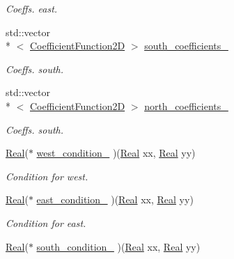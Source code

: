 \begin{DoxyCompactItemize}
\begin{DoxyCompactList}\small\item\em Coeffs. east. \end{DoxyCompactList}\item 
std\+::vector\\*
$<$ \hyperlink{group__c07-mim__ops_gad9e1c0ace886b0029aefffa5f320e852}{Coefficient\+Function2\+D} $>$ \hyperlink{classmtk_1_1BCDescriptor2D_a263309b9ad288dc89826d818d9378d07}{south\+\_\+coefficients\+\_\+}
\begin{DoxyCompactList}\small\item\em Coeffs. south. \end{DoxyCompactList}\item 
std\+::vector\\*
$<$ \hyperlink{group__c07-mim__ops_gad9e1c0ace886b0029aefffa5f320e852}{Coefficient\+Function2\+D} $>$ \hyperlink{classmtk_1_1BCDescriptor2D_a5429c040c034303dd92dcff554f9efad}{north\+\_\+coefficients\+\_\+}
\begin{DoxyCompactList}\small\item\em Coeffs. south. \end{DoxyCompactList}\item 
\hyperlink{group__c01-roots_gac080bbbf5cbb5502c9f00405f894857d}{Real}($\ast$ \hyperlink{classmtk_1_1BCDescriptor2D_a2d4af48b3408658c7ace6eeb74464c9f}{west\+\_\+condition\+\_\+} )(\hyperlink{group__c01-roots_gac080bbbf5cbb5502c9f00405f894857d}{Real} xx, \hyperlink{group__c01-roots_gac080bbbf5cbb5502c9f00405f894857d}{Real} yy)
\begin{DoxyCompactList}\small\item\em Condition for west. \end{DoxyCompactList}\item 
\hyperlink{group__c01-roots_gac080bbbf5cbb5502c9f00405f894857d}{Real}($\ast$ \hyperlink{classmtk_1_1BCDescriptor2D_a6cca0c70293203c9d88773e5d5f93418}{east\+\_\+condition\+\_\+} )(\hyperlink{group__c01-roots_gac080bbbf5cbb5502c9f00405f894857d}{Real} xx, \hyperlink{group__c01-roots_gac080bbbf5cbb5502c9f00405f894857d}{Real} yy)
\begin{DoxyCompactList}\small\item\em Condition for east. \end{DoxyCompactList}\item 
\hyperlink{group__c01-roots_gac080bbbf5cbb5502c9f00405f894857d}{Real}($\ast$ \hyperlink{classmtk_1_1BCDescriptor2D_a2a933b473abbe47ad7c79ef7939e7768}{south\+\_\+condition\+\_\+} )(\hyperlink{group__c01-roots_gac080bbbf5cbb5502c9f00405f894857d}{Real} xx, \hyperlink{group__c01-roots_gac080bbbf5cbb5502c9f00405f894857d}{Real} yy)

\end{DoxyCompactItemize}
